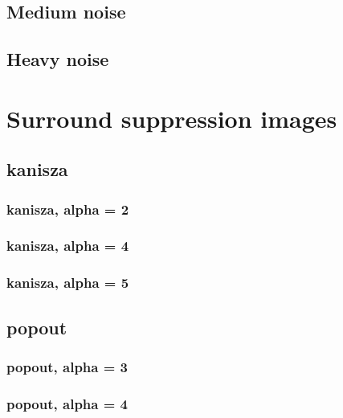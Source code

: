 \documentclass[10pt,a4paper]{article}
\begin{document}
\subsection{Medium noise}

\subsection{Heavy noise}


\section{Surround suppression images}
\subsection{kanisza}

\subsubsection{kanisza, alpha = 2}

\subsubsection{kanisza, alpha = 4}

\subsubsection{kanisza, alpha = 5}



\subsection{popout}

\subsubsection{popout, alpha = 3}

\subsubsection{popout, alpha = 4}

\end{document}
